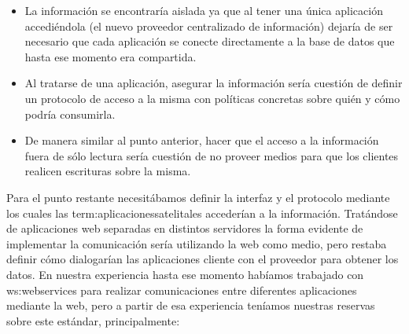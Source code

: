 \begin{itemize}
  \item La información se encontraría aislada ya que al tener una única aplicación accediéndola (el nuevo proveedor centralizado de información) dejaría de ser necesario que cada aplicación se conecte directamente a la base de datos que hasta ese momento era compartida.

  \item Al tratarse de una aplicación, asegurar la información sería cuestión de definir un protocolo de acceso a la misma con políticas concretas sobre quién y cómo podría consumirla.

  \item De manera similar al punto anterior, hacer que el acceso a la información fuera de sólo lectura sería cuestión de no proveer medios para que los clientes realicen escrituras sobre la misma.
\end{itemize}

Para el punto restante necesitábamos definir la interfaz y el protocolo mediante los cuales las \gls{term:aplicacionessatelitales} accederían a la información. Tratándose de aplicaciones web separadas en distintos servidores la forma evidente de implementar la comunicación sería utilizando la web como medio, pero restaba definir cómo dialogarían las aplicaciones cliente con el proveedor para obtener los datos. En nuestra experiencia hasta ese momento habíamos trabajado con \glspl{ws:webservice} para realizar comunicaciones entre diferentes aplicaciones mediante la web, pero a partir de esa experiencia teníamos nuestras reservas sobre este estándar, principalmente:

